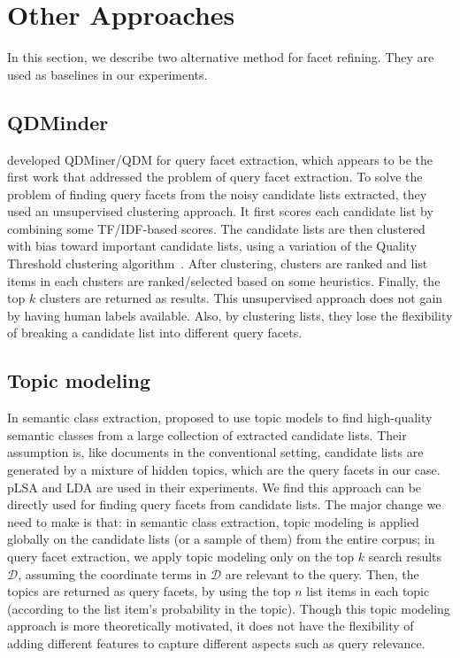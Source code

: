 \section{Other Approaches}
\label{sec:facet-other}
In this section, we describe two alternative method for facet refining. They are used as baselines in our experiments. 

\subsection{QDMinder}
\citet{dou2011finding} developed QDMiner/QDM for query facet extraction, which appears to be the first work that addressed the problem of query facet extraction.
To solve the problem of finding query facets from the noisy candidate lists extracted, they used an unsupervised clustering approach.
It first scores each candidate list by combining some TF/IDF-based scores.
The candidate lists are then clustered with bias toward important candidate lists, 
using a variation of the Quality Threshold clustering algorithm~\cite{heyer1999exploring}.
After clustering, clusters are ranked and list items in each clusters are ranked/selected based on some heuristics.
Finally, the top $k$ clusters are returned as results.
This unsupervised approach does not gain by having human labels available.
Also, by clustering lists, they lose the flexibility of breaking a candidate list into different query facets.

\subsection{Topic modeling}
In semantic class extraction, \citet{zhang2009employing} proposed to use topic models 
to find high-quality semantic classes from a large collection of extracted candidate lists.
Their assumption is, like documents in the conventional setting, candidate lists are generated by a mixture of hidden topics, which are the query facets in our case. pLSA and LDA are used in their experiments.
We find this approach can be directly used for finding query facets from candidate lists.
The major change we need to make is that: in semantic class extraction, topic modeling is applied globally on the candidate lists (or a sample of them) from the entire corpus; in query facet extraction, we apply topic modeling only on the top $k$ search results $\mathcal{D}$, assuming the coordinate terms in $\mathcal{D}$ are relevant to the query.
Then, the topics are returned as query facets, by using the top $n$ list items in each topic (according to the list item's probability in the topic).
Though this topic modeling approach is more theoretically motivated, it does not have the flexibility of adding different features to capture different aspects such as query relevance.

